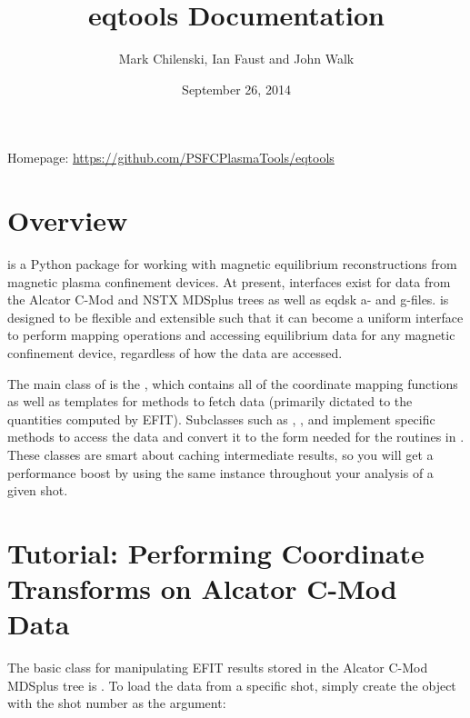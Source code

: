 \documentclass[letterpaper,10pt,english]{sphinxmanual}
\title{eqtools Documentation}
\date{September 26, 2014}
\author{Mark Chilenski, Ian Faust and John Walk}
\begin{document}
\maketitle
\tableofcontents
{}\label{index::doc}


Homepage: \href{https://github.com/PSFCPlasmaTools/eqtools}{https://github.com/PSFCPlasmaTools/eqtools}


\chapter{Overview}
\label{index:overview}\label{index:eqtools-tools-for-interacting-with-magnetic-equilibria}
{\hyperref[eqtools:module-eqtools]{}} is a Python package for working with magnetic equilibrium reconstructions from magnetic plasma confinement devices. At present, interfaces exist for data from the Alcator C-Mod and NSTX MDSplus trees as well as eqdsk a- and g-files. {\hyperref[eqtools:module-eqtools]{}} is designed to be flexible and extensible such that it can become a uniform interface to perform mapping operations and accessing equilibrium data for any magnetic confinement device, regardless of how the data are accessed.

The main class of {\hyperref[eqtools:module-eqtools]{}} is the {\hyperref[eqtools:eqtools.core.Equilibrium]{}}, which contains all of the coordinate mapping functions as well as templates for methods to fetch data (primarily dictated to the quantities computed by EFIT). Subclasses such as {\hyperref[eqtools:eqtools.EFIT.EFITTree]{}}, {\hyperref[eqtools:eqtools.CModEFIT.CModEFITTree]{}}, {\hyperref[eqtools:eqtools.NSTXEFIT.NSTXEFITTree]{}} and {\hyperref[eqtools:eqtools.eqdskreader.EqdskReader]{}} implement specific methods to access the data and convert it to the form needed for the routines in {\hyperref[eqtools:eqtools.core.Equilibrium]{}}. These classes are smart about caching intermediate results, so you will get a performance boost by using the same instance throughout your analysis of a given shot.


\chapter{Tutorial: Performing Coordinate Transforms on Alcator C-Mod Data}
\label{index:tutorial-performing-coordinate-transforms-on-alcator-c-mod-data}
The basic class for manipulating EFIT results stored in the Alcator C-Mod MDSplus tree is {\hyperref[eqtools:eqtools.CModEFIT.CModEFITTree]{}}. To load the data from a specific shot, simply create the {\hyperref[eqtools:eqtools.CModEFIT.CModEFITTree]{}} object with the shot number as the argument:
\end{document}
